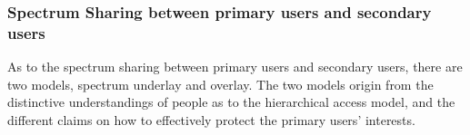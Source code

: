 \subsubsection*{Spectrum Sharing between primary users and secondary users}
As to the spectrum sharing between primary users and secondary users, there are two models, spectrum underlay and overlay.
The two models origin from the distinctive understandings of people as to the hierarchical access model, and the different claims on how to effectively protect the primary users' interests.


